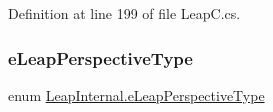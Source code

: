 Definition at line 199 of file Leap\+C.\+cs.

\mbox{\label{namespace_leap_internal_af2a2bc35637b8a453ff772a09a0987a1}} 
\subsubsection{\texorpdfstring{eLeapPerspectiveType}{eLeapPerspectiveType}}
{\footnotesize\ttfamily enum \mbox{\hyperlink{namespace_leap_internal_af2a2bc35637b8a453ff772a09a0987a1}{Leap\+Internal.\+e\+Leap\+Perspective\+Type}}\hspace{0.3cm}{\ttfamily [strong]}}

